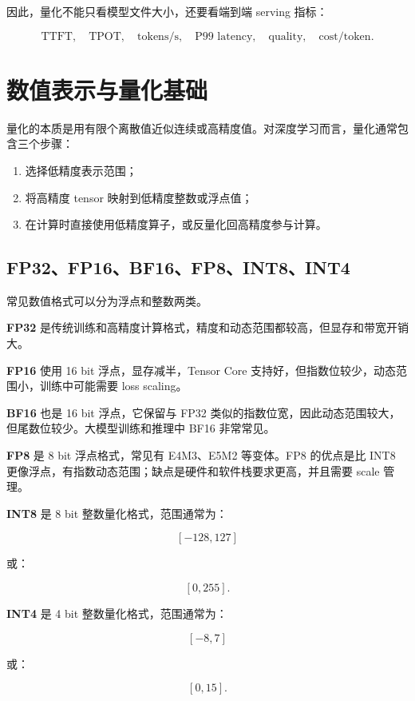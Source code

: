 因此，量化不能只看模型文件大小，还要看端到端 serving 指标：

\[
\text{TTFT},\quad
\text{TPOT},\quad
\text{tokens/s},\quad
\text{P99 latency},\quad
\text{quality},\quad
\text{cost/token}.
\]

\section{数值表示与量化基础}
\label{sec:numerical-representation-and-quantization-basics}

量化的本质是用有限个离散值近似连续或高精度值。对深度学习而言，量化通常包含三个步骤：

\begin{enumerate}
\item 选择低精度表示范围；
\item 将高精度 tensor 映射到低精度整数或浮点值；
\item 在计算时直接使用低精度算子，或反量化回高精度参与计算。
\end{enumerate}

\subsection{FP32、FP16、BF16、FP8、INT8、INT4}
\label{subsec:number-formats}

常见数值格式可以分为浮点和整数两类。

\textbf{FP32} 是传统训练和高精度计算格式，精度和动态范围都较高，但显存和带宽开销大。

\textbf{FP16} 使用 16 bit 浮点，显存减半，Tensor Core 支持好，但指数位较少，动态范围小，训练中可能需要 loss scaling。

\textbf{BF16} 也是 16 bit 浮点，它保留与 FP32 类似的指数位宽，因此动态范围较大，但尾数位较少。大模型训练和推理中 BF16 非常常见。

\textbf{FP8} 是 8 bit 浮点格式，常见有 E4M3、E5M2 等变体。FP8 的优点是比 INT8 更像浮点，有指数动态范围；缺点是硬件和软件栈要求更高，并且需要 scale 管理。

\textbf{INT8} 是 8 bit 整数量化格式，范围通常为：

\[
[-128,127]
\]

或：

\[
[0,255].
\]

\textbf{INT4} 是 4 bit 整数量化格式，范围通常为：

\[
[-8,7]
\]

或：

\[
[0,15].
\]

